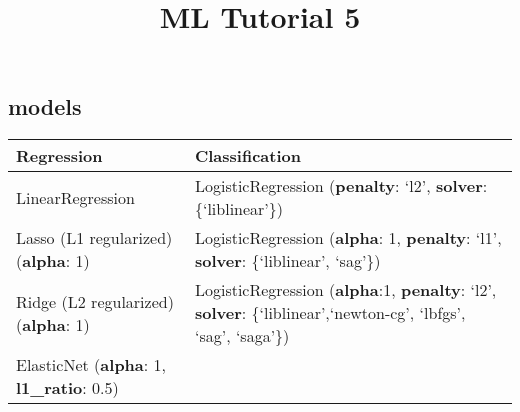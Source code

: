 \documentclass[11pt]{article}
\title{ML Tutorial 5}
\begin{document}
    
    
    \maketitle
    
    

    
    \hypertarget{models}{%
\subsection{models}\label{models}}

\begin{longtable}[]{@{}ll@{}}
\toprule
\begin{minipage}[b]{0.47\columnwidth}\raggedright
\textbf{Regression}\strut
\end{minipage} & \begin{minipage}[b]{0.47\columnwidth}\raggedright
\textbf{Classification}\strut
\end{minipage}\tabularnewline
\midrule
\endhead
\begin{minipage}[t]{0.47\columnwidth}\raggedright
LinearRegression\strut
\end{minipage} & \begin{minipage}[t]{0.47\columnwidth}\raggedright
LogisticRegression {(\textbf{penalty}: `l2', \textbf{solver}:
\{`liblinear'\})}\strut
\end{minipage}\tabularnewline
\begin{minipage}[t]{0.47\columnwidth}\raggedright
Lasso (L1 regularized) {(\textbf{alpha}: 1)}\strut
\end{minipage} & \begin{minipage}[t]{0.47\columnwidth}\raggedright
LogisticRegression {(\textbf{alpha}: 1, \textbf{penalty}: `l1',
\textbf{solver}: \{`liblinear', `sag'\})}\strut
\end{minipage}\tabularnewline
\begin{minipage}[t]{0.47\columnwidth}\raggedright
Ridge (L2 regularized) {(\textbf{alpha}: 1)}\strut
\end{minipage} & \begin{minipage}[t]{0.47\columnwidth}\raggedright
LogisticRegression {(\textbf{alpha}:1, \textbf{penalty}: `l2',
\textbf{solver}: \{`liblinear',`newton-cg', `lbfgs', `sag',
`saga'\})}\strut
\end{minipage}\tabularnewline
\begin{minipage}[t]{0.47\columnwidth}\raggedright
ElasticNet {(\textbf{alpha}: 1, \textbf{l1\_ratio}: 0.5)}\strut
\end{minipage} & \begin{minipage}[t]{0.47\columnwidth}\raggedright

\end{minipage}
\end{longtable}
\end{document}
